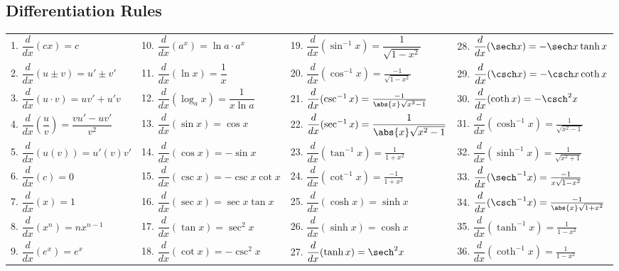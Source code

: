 \pagestyle{empty}



%

\subsection{Differentiation Rules}
\bgroup
\footnotesize
\renewcommand{\arraystretch}{2.5}
\noindent\begin{tabular}{llll}
1. $\dfrac d{dx}(cx)=c$ &
10. $\dfrac d{dx}(a^x)=\ln a\cdot a^x$ &
19. $\dfrac d{dx}(\sin^{-1}x)=\dfrac1{\sqrt{1-x^2}}$ &
28. $\dfrac d{dx}(\sech x)=-\sech x\tanh x$ \\
2. $\dfrac d{dx}(u\pm v)=u'\pm v'$ &
11. $\dfrac d{dx}(\ln x)=\dfrac1x$ &
20. $\dfrac d{dx}(\cos^{-1}x)=\frac{-1}{\sqrt{1-x^2}}$ &
29. $\dfrac d{dx}(\csch x)=-\csch x\coth x$ \\
3. $\dfrac d{dx}(u\cdot v)=uv'+u'v$\qquad\null &
12. $\dfrac d{dx}(\log_a x)=\dfrac1{x\ln a}$ &
21. $\dfrac d{dx}(\csc^{-1}x)=\frac{-1}{\abs{x}\sqrt{x^2-1}}$ &
30. $\dfrac d{dx}(\coth x)=-\csch^2 x$ \\
4. $\dfrac d{dx}(\dfrac uv)=\dfrac{vu'-uv'}{v^2}$ &
13. $\dfrac d{dx}(\sin x)=\cos x$ &
22. $\dfrac d{dx}(\sec^{-1}x)=\dfrac1{\abs{x}\sqrt{x^2-1}}$\qquad\null &
31. $\dfrac d{dx}(\cosh^{-1}x)=\frac1{\sqrt{x^2-1}}$ \\
5. $\dfrac d{dx}(u(v))=u'(v)v'$ &
14. $\dfrac d{dx}(\cos x)=-\sin x$ &
23. $\dfrac d{dx}(\tan^{-1}x)=\frac1{1+x^2}$ &
32. $\dfrac d{dx}(\sinh^{-1}x)=\frac1{\sqrt{x^2+1}}$ \\
6. $\dfrac d{dx}(c)=0$ &
15. $\dfrac d{dx}(\csc x)=-\csc x\cot x$\qquad\null &
24. $\dfrac d{dx}(\cot^{-1}x)=\frac{-1}{1+x^2}$ &
33. $\dfrac d{dx}(\sech^{-1}x)=\frac{-1}{x\sqrt{1-x^2}}$ \\
7. $\dfrac d{dx}(x)=1$ &
16. $\dfrac d{dx}(\sec x)=\sec x\tan x$ &
25. $\dfrac d{dx}(\cosh x)=\sinh x$ &
34. $\dfrac d{dx}(\csch^{-1}x)=\frac{-1}{\abs{x}\sqrt{1+x^2}}$ \\
8. $\dfrac d{dx}(x^n)=nx^{n-1}$ &
17. $\dfrac d{dx}(\tan x)=\sec^2x$ &
26. $\dfrac d{dx}(\sinh x)=\cosh x$ &
35. $\dfrac d{dx}(\tanh^{-1}x)=\frac1{1-x^2}$ \\
9. $\dfrac d{dx}(e^x)=e^x$ &
18. $\dfrac d{dx}(\cot x)=-\csc^2x$ &
27. $\dfrac d{dx}(\tanh x)=\sech^2x$ &
36. $\dfrac d{dx}(\coth^{-1}x)=\frac1{1-x^2}$
\end{tabular}

